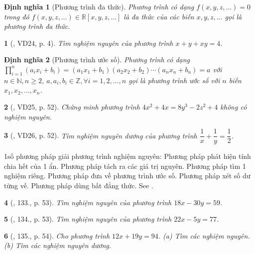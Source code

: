 \documentclass{article}
\newtheorem{baitoan}{}
\newtheorem{dinhnghia}{Định nghĩa}
\begin{document}
\begin{dinhnghia}[Phương trình đa thức]
	Phương trình có dạng $f(x,y,z,\ldots) = 0$ trong đó $f(x,y,z,\ldots)\in\mathbb{R}[x,y,z,\ldots]$ là đa thức của các biến $x,y,z,\ldots$ gọi là {\rm phương trình đa thức}.
\end{dinhnghia}

\begin{baitoan}[\cite{Tuyen_Toan_9_old}, VD24, p. 4]
	Tìm nghiệm nguyên của phương trình $x + y + xy = 4$.
\end{baitoan}

\begin{dinhnghia}[Phương trình ước số]
	Phương trình có dạng $\prod_{i=1}^n (a_ix_i + b_i) = (a_1x_1 + b_1)(a_2x_2 + b_2)\cdots(a_nx_n + b_n) = a$ với $n\in\mathbb{N},n\ge2$, $a,a_i,b_i\in\mathbb{Z},\forall i = 1,2,\ldots,n$ gọi là {\rm phương trình ước số} với $n$ biến $x_1,x_2,\ldots,x_n$.
\end{dinhnghia}

\begin{baitoan}[\cite{Tuyen_Toan_9_old}, VD25, p. 52]
	Chứng minh phương trình $4x^2 + 4x = 8y^3 - 2z^2 + 4$ không có nghiệm nguyên.
\end{baitoan}

\begin{baitoan}[\cite{Tuyen_Toan_9_old}, VD26, p. 52]
	Tìm nghiệm nguyên dương của phương trình $\dfrac{1}{x} + \dfrac{1}{y} = \dfrac{1}{2}$.
\end{baitoan}
1số phương pháp giải phương trình nghiệm nguyên: Phương pháp phát hiện tính chia hết của 1 ẩn. Phương pháp tách ra các giá trị nguyên. Phương pháp tìm 1 nghiệm riêng. Phương pháp đưa về phương trình ước số. Phương pháp xét số dư từng vế. Phương pháp dùng bất đẳng thức. See \cite{Binh_PTNN}.

\begin{baitoan}[\cite{Tuyen_Toan_9_old}, 133., p. 53]
	Tìm nghiệm nguyên của phương trình $18x - 30y = 59$.
\end{baitoan}

\begin{baitoan}[\cite{Tuyen_Toan_9_old}, 134., p. 53]
	Tìm nghiệm nguyên của phương trình $22x - 5y = 77$.
\end{baitoan}

\begin{baitoan}[\cite{Tuyen_Toan_9_old}, 135., p. 54]
	Cho phương trình $12x + 19y = 94$. (a) Tìm các nghiệm nguyên. (b) Tìm các nghiệm nguyên dương.
\end{baitoan}
\end{document}
